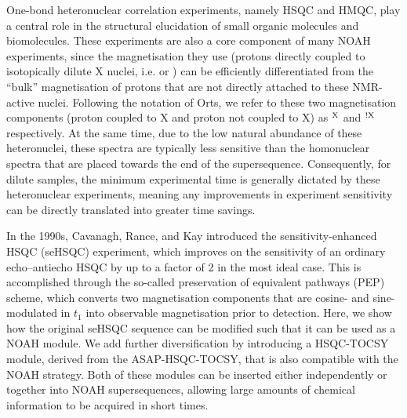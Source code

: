 \documentclass[11pt]{article}
\newcommand*{\hl}[1]{\textcolor{WildStrawberry}{#1}}
\newcommand*{\carbon}{\ce{^{13}C}}
\newcommand*{\nitrogen}{\ce{^{15}N}}
\newcommand*{\magn}[1]{\ce{^1H}$^{#1}$}
\newcommand*{\magnnot}[1]{\ce{^1H}$^{!#1}$}
\begin{document}
One-bond heteronuclear correlation experiments, namely HSQC and HMQC, play a central role in the structural elucidation of small organic molecules and biomolecules.\autocite{textbooks}
These experiments are also a core component of many NOAH experiments, since the magnetisation they use (protons directly coupled to isotopically dilute X nuclei, i.e. \carbon{} or \nitrogen{}) can be efficiently differentiated from the ``bulk'' magnetisation of protons that are not directly attached to these NMR-active nuclei.\autocite{Garbow1982CPL, Kupce2019JMR}
Following the notation of Orts,\autocite{Orts2018M} we refer to these two magnetisation components (proton coupled to X and proton not coupled to X) as \magn{\ce{X}} and \magnnot{\ce{X}} respectively.
At the same time, due to the low natural abundance of these heteronuclei, these spectra are typically less sensitive than the homonuclear spectra that are placed towards the end of the supersequence.
Consequently, for dilute samples, the minimum experimental time is generally dictated by these heteronuclear experiments, meaning any improvements in experiment sensitivity can be directly translated into greater time savings.

In the 1990s, Cavanagh, Rance, and Kay introduced the sensitivity-enhanced HSQC (seHSQC) experiment,\autocite{sehsqc} which improves on the sensitivity of an ordinary echo--antiecho HSQC by up to a factor of 2 \hl{in the most ideal case}.
This is accomplished through the so-called preservation of equivalent pathways (PEP) scheme, which converts two magnetisation components that are cosine- and sine-modulated in $t_1$ into observable magnetisation prior to detection.
Here, we show how the original seHSQC sequence can be modified such that it can be used as a NOAH module.
We add further diversification by introducing a HSQC-TOCSY module, derived from the ASAP-HSQC-TOCSY,\autocite{Becker2019JMR} that is also compatible with the NOAH strategy.
Both of these modules can be inserted either independently or together into NOAH supersequences, allowing large amounts of chemical information to be acquired in short times.


\end{document}
